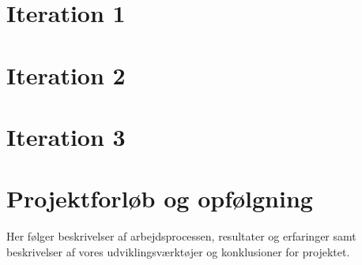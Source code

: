 


\raggedbottom










\cleardoublepage %
\tableofcontents*









\chapter{Iteration 1}


\chapter{Iteration 2}


\chapter{Iteration 3}


\chapter{Projektforløb og opfølgning}
Her følger beskrivelser af arbejdsprocessen, resultater og erfaringer samt beskrivelser af vores udviklingsværktøjer og konklusioner for projektet.

















